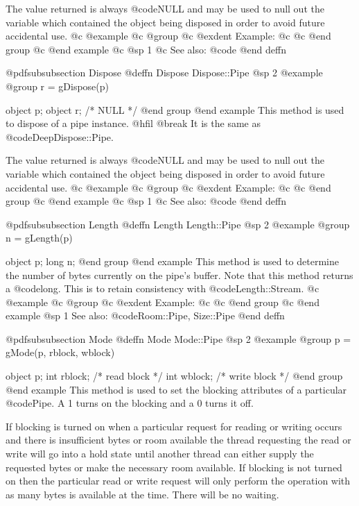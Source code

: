 The value returned is always @code{NULL} and may be used to null out
the variable which contained the object being disposed in order to
avoid future accidental use.
@c @example
@c @group
@c @exdent Example:
@c 
@c @end group
@c @end example
@c @sp 1
@c See also:  @code{}
@end deffn








@pdfsubsubsection {Dispose}
@deffn {Dispose} Dispose::Pipe
@sp 2
@example
@group
r = gDispose(p)

object  p;
object  r;     /*  NULL  */
@end group
@end example
This method is used to dispose of a pipe instance.  
@hfil @break It is the same as @code{DeepDispose::Pipe}.

The value returned is always @code{NULL} and may be used to null out
the variable which contained the object being disposed in order to
avoid future accidental use.
@c @example
@c @group
@c @exdent Example:
@c 
@c @end group
@c @end example
@c @sp 1
@c See also:  @code{}
@end deffn








@pdfsubsubsection {Length}
@deffn {Length} Length::Pipe
@sp 2
@example
@group
n = gLength(p)

object  p;
long    n;
@end group
@end example
This method is used to determine the number of bytes currently on
the pipe's buffer.  Note that this method returns a @code{long}.
This is to retain consistency with @code{Length::Stream}.
@c @example
@c @group
@c @exdent Example:
@c 
@c @end group
@c @end example
@sp 1
See also:  @code{Room::Pipe, Size::Pipe}
@end deffn







@pdfsubsubsection {Mode}
@deffn {Mode} Mode::Pipe
@sp 2
@example
@group
p = gMode(p, rblock, wblock)

object  p;
int     rblock;   /*  read block   */
int     wblock;   /*  write block  */
@end group
@end example
This method is used to set the blocking attributes of a particular
@code{Pipe}.  A 1 turns on the blocking and a 0 turns it off.

If blocking is turned on when a particular request for reading or
writing occurs and there is insufficient bytes or room available
the thread requesting the read or write will go into a hold state
until another thread can either supply the requested bytes or
make the necessary room available.  If blocking is not turned on
then the particular read or write request will only perform the
operation with as many bytes is available at the time.  There
will be no waiting.

